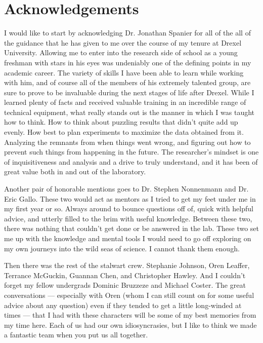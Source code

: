 \chapter*{Acknowledgements}


I would like to start by acknowledging Dr. Jonathan Spanier for all of the all of the guidance that he has given to me over the course of my tenure at Drexel University. Allowing me to enter into the research side of school as a young freshman with stars in his eyes was undeniably one of the defining points in my academic career. The variety of skills I have been able to learn while working with him, and of course all of the members of his extremely talented group, are sure to prove to be invaluable during the next stages of life after Drexel. While I learned plenty of facts and received valuable training in an incredible range of technical equipment, what really stands out is the manner in which I was taught how to think. How to think about puzzling results that didn't quite add up evenly. How best to plan experiments to maximize the data obtained from it. Analyzing the remnants from when things went wrong, and figuring out how to prevent such things from happening in the future. The researcher's mindset is one of inquisitiveness and analysis and a drive to truly understand, and it has been of great value both in and out of the laboratory. 

Another pair of honorable mentions goes to Dr. Stephen Nonnenmann and Dr. Eric Gallo. These two would act as mentors as I tried to get my feet under me in my first year or so. Always around to bounce questions off of, quick with helpful advice, and utterly filled to the brim with useful knowledge. Between these two, there was nothing that couldn't get done or be answered in the lab. These two set me up with the knowledge and mental tools I would need to go off exploring on my own journeys into the wild seas of science. I cannot thank them enough. 

Then there was the rest of the stalwart crew. Stephanie Johnson, Oren Leaffer, Terrance McGuckin, Guannan Chen, and Christopher Hawley. And I couldn't forget my fellow undergrads Dominic Bruzzeze and Michael Coster. The great conversations --- especially with Oren (whom I can still count on for some useful advice about any question) even if they tended to get a little long-winded at times --- that I had with these characters will be some of my best memories from my time here. Each of us had our own idiosyncrasies, but I like to think we made a fantastic team when you put us all together. 

